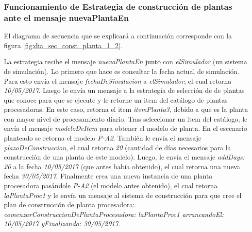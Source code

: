 \subsubsection{Funcionamiento de Estrategia de construcción de plantas ante el mensaje nuevaPlantaEn}
\label{sec:dia_sec_estr_nuevaplanta}
\par El diagrama de secuencia que se explicará a continuación corresponde con la figura \ref{fig:dia_sec_const_planta_1_2}.
\par La estrategia recibe el mensaje \textit{nuevaPlantaEn} junto con \textit{elSimulador} (un sistema de simulación). Lo primero que hace es consultar la fecha actual de simulación. Para esto envía el mensaje \textit{fechaDeSimulacion} a \textit{elSimulador}, el cual retorna \textit{10/05/2017}. Luego le envía un mensaje a la estrategia de selección de de plantas que conoce para que se ejecute y le retorne un item del catálogo de plantas procesadoras. En este caso, retorna el item \textit{itemPlanta3}, debido a que es la planta con mayor nivel de procesamiento diario. Tras seleccionar un item del catálogo, le envía el mensaje \textit{modeloDeItem} para obtener el modelo de planta. En el escenario planteado se retorna el modelo \textit{P-A2}. También le envía el mensaje \textit{plazoDeConstruccion}, el cual retorna \textit{20} (cantidad de días necesarios para la construcción de una planta de este modelo). Luego, le envía el mensaje \textit{addDays: 20} a la fecha \textit{10/05/2017} (que antes había obtenido), el cual retorna una nueva fecha \textit{30/05/2017}. Finalmente crea una nueva instancia de una planta procesadora pasándole \textit{P-A2} (el modelo antes obtenido), el cual retorna \textit{laPlantaProc1} y le envía un mensaje al sistema de construcción para que cree el plan de construcción de planta procesadora: \textit{comenzarConstruccionDePlantaProcesadora: laPlantaProc1 arrancandoEl: 10/05/2017 yFinalizando: 30/05/2017}.

